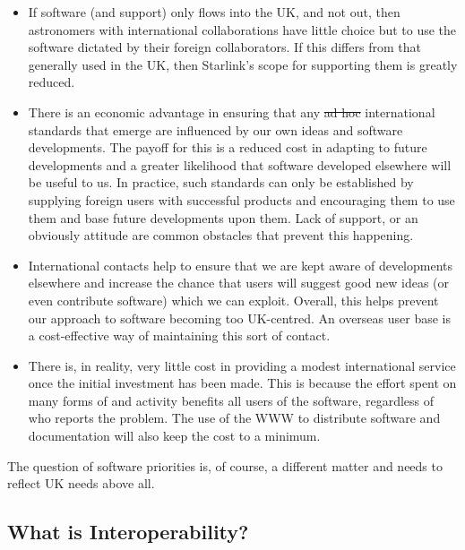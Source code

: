 \begin{itemize}
\item If software (and support) only flows into the UK, and
not out, then astronomers with international collaborations have
little choice but to use the software dictated by their foreign
collaborators. If this differs from that generally used in the UK,
then Starlink's scope for supporting them is greatly reduced.

\item There is an economic advantage in ensuring that any \st{ad hoc}
international standards that emerge are influenced by our own ideas
and software developments. The payoff for this is a reduced cost in
adapting to future developments and a greater likelihood that software
developed elsewhere will be useful to us. In practice, such standards
can only be established by supplying foreign users with successful
products and encouraging them to use them and base future developments
upon them. Lack of support, or an obviously  attitude are
common obstacles that prevent this happening.

\item International contacts help to ensure that we are kept aware of
developments elsewhere and increase the chance that users will suggest
good new ideas (or even contribute software) which we can
exploit. Overall, this helps prevent our approach to software becoming
too UK-centred. An overseas user base is a cost-effective way of
maintaining this sort of contact.

\item There is, in reality, very little cost in providing a modest
international service once the initial investment has been made. This
is because the effort spent on many forms of \st{} and
\st{} activity benefits all users of the software, regardless
of who reports the problem.  The use of the WWW to distribute software
and documentation will also keep the cost to a minimum.

\end{itemize}

The question of software \st{} priorities is, of course, a
different matter and needs to reflect UK needs above all.

\subsection{\label{interop}What is Interoperability?}

